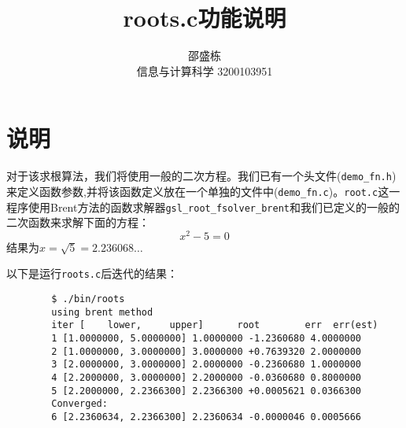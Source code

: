 \documentclass[hyperref,UTF8]{ctexart}
\title{\textbf{roots.c}功能说明}
\author{邵盛栋 \\ 信息与计算科学 3200103951}
\begin{document}
	
	\maketitle	
	\section*{说明}
	对于该求根算法，我们将使用一般的二次方程。我们已有一个头文件(\verb|demo_fn.h|)来定义函数参数,并将该函数定义放在一个单独的文件中(\verb|demo_fn.c|)。\verb|root.c|这一程序使用Brent方法的函数求解器\verb|gsl_root_fsolver_brent|和我们已定义的一般的二次函数来求解下面的方程：
	\[x^{2}-5=0\]
	结果为$ x=\sqrt{5}=2.236068\dots $
	
	以下是运行\verb|roots.c|后迭代的结果：
	\begin{verbatim}
		$ ./bin/roots 
		using brent method
		iter [    lower,     upper]      root        err  err(est)
		1 [1.0000000, 5.0000000] 1.0000000 -1.2360680 4.0000000
		2 [1.0000000, 3.0000000] 3.0000000 +0.7639320 2.0000000
		3 [2.0000000, 3.0000000] 2.0000000 -0.2360680 1.0000000
		4 [2.2000000, 3.0000000] 2.2000000 -0.0360680 0.8000000
		5 [2.2000000, 2.2366300] 2.2366300 +0.0005621 0.0366300
		Converged:
		6 [2.2360634, 2.2366300] 2.2360634 -0.0000046 0.0005666
	\end{verbatim}
\end{document}
